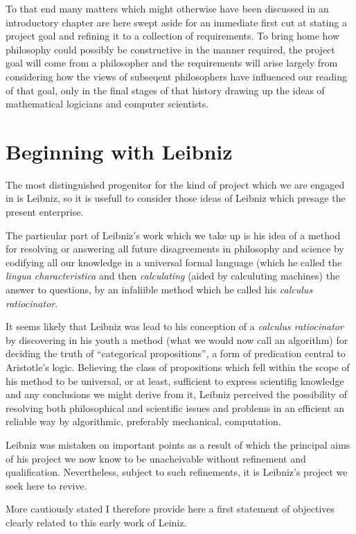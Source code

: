 To that end many matters which might otherwise have been discussed in an introductory chapter are here swept aside for an immediate first cut at stating a project goal and refining it to a collection of requirements.
To bring home how philosophy could possibly be constructive in the manner required, the project goal will come from a philosopher and the requirements will arise largely from considering how the views of subseqent philosophers have influenced our reading of that goal, only in the final stages of that history drawing up the ideas of mathematical logicians and computer scientists.

\section{Beginning with Leibniz}

The most distinguished progenitor for the kind of project which we are engaged in is Leibniz, so it is usefull to consider those ideas of Leibniz which presage the present enterprise.

The particular part of Leibniz's work which we take up is his idea of a method for resolving or answering all future disagreements in philosophy and science by codifying all our knowledge in a universal formal language (which he called the {\it lingua characteristica} and then {\it calculating} (aided by calculuting machines) the answer to questions, by an infaliible method which he called his {\it calculus ratiocinator}.

It seems likely that Leibniz was lead to his conception of a {\it calculus ratiocinator} by discovering in his youth a method (what we would now call an algorithm) for deciding the truth of ``categorical propositions'', a form of predication central to Aristotle's logic.
Believing the class of propositions which fell within the scope of his method to be universal, or at least, sufficient to express scientifig knowledge and any conclusions we might derive from it, Leibniz perceived the possibility of resolving both philosophical and scientific issues and problems in an efficient an reliable way by algorithmic, preferably mechanical, computation.

Leibniz was mistaken on important points as a result of which the principal aims of his project we now know to be unacheivable without refinement and qualification.
Nevertheless, subject to such refinements, it is Leibniz's project we seek here to revive.

More cautiously stated I therefore provide here a first statement of objectives clearly related to this early work of Leiniz.


